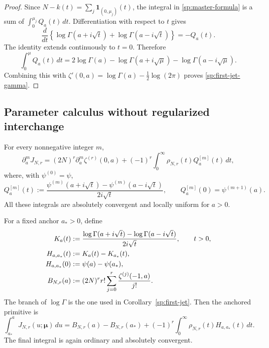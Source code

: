 \begin{proof}
Since $N-k(t)=\sum_j\boldsymbol1_{(0,\mu_j)}(t)$, the integral
in \eqref{sp:master-formula} is a sum of $\int_0^{\mu_j}Q_a(t)\,dt$.
Differentiation with respect to $t$ gives
\[
 \frac{d}{dt}\left\{
   \log\Gamma(a+i\sqrt t)+\log\Gamma(a-i\sqrt t)\right\}
 =-Q_a(t).
\]
The identity extends continuously to $t=0$.  Therefore
\[
 \int_0^\mu Q_a(t)\,dt
 =2\log\Gamma(a)-\log\Gamma(a+i\sqrt\mu)
                       -\log\Gamma(a-i\sqrt\mu).
\]
Combining this with
$\zeta'(0,a)=\log\Gamma(a)-\tfrac12\log(2\pi)$ proves
\eqref{sp:first-jet-gamma}.
\end{proof}

\subsection{Parameter calculus without regularized interchange}
\label{sp:parameters}

\begin{proposition}
\label{sp:a-calculus}
For every nonnegative integer $m$,
\begin{equation}
 \partial_a^mJ_{N,r}
 =(2N)^r\partial_a^m\zeta^{(r)}(0,a)
   +(-1)^r\int_0^{\infty}\rho_{N,r}(t)Q_a^{[m]}(t)\,dt,
 \label{sp:a-derivatives}
\end{equation}
where, with $\psi^{(0)}=\psi$,
\begin{equation}
 Q_a^{[m]}(t):=
 \frac{\psi^{(m)}(a+i\sqrt t)-\psi^{(m)}(a-i\sqrt t)}
      {2i\sqrt t},
 \qquad Q_a^{[m]}(0)=\psi^{(m+1)}(a).
 \label{sp:polygamma-kernel}
\end{equation}
All these integrals are absolutely convergent and locally uniform
for $a>0$.

For a fixed anchor $a_*>0$, define
\begin{align}
 K_a(t)&:=\frac{\log\Gamma(a+i\sqrt t)-\log\Gamma(a-i\sqrt t)}
                      {2i\sqrt t},\qquad t>0,\notag\\
 H_{a,a_*}(t)&:=K_a(t)-K_{a_*}(t),
 \label{sp:gamma-kernel}\\
 H_{a,a_*}(0)&:=\psi(a)-\psi(a_*),\notag\\
 B_{N,r}(a)
 &:=(2N)^r r!\sum_{j=0}^{r}\frac{\zeta^{(j)}(-1,a)}{j!}.
 \label{sp:primitive-baseline}
\end{align}
The branch of $\log\Gamma$ is the one used in
Corollary~\ref{sp:first-jet}.  Then the anchored primitive is
\begin{equation}
 \int_{a_*}^{a}J_{N,r}(u;\boldsymbol\mu)\,du
 =B_{N,r}(a)-B_{N,r}(a_*)
     +(-1)^r\int_0^{\infty}
                      \rho_{N,r}(t)H_{a,a_*}(t)\,dt.
 \label{sp:anchored-primitive}
\end{equation}
The final integral is again ordinary and absolutely convergent.
\end{proposition}


